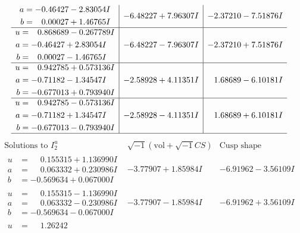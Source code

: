 \documentclass[1p]{elsarticle_modified}
\theoremstyle{definition}
\newcommand{\I}{\sqrt{-1}}
\begin{document}
$$\begin{array}{c|c|c}
\begin{aligned}
a &= -0.46427 - 2.83054 I \\
b &= \phantom{-}0.00027 + 1.46765 I\end{aligned}
 & -6.48227 + 7.96307 I & -2.37210 - 7.51876 I \\ \hline\begin{aligned}
u &= \phantom{-}0.868689 - 0.267789 I \\
a &= -0.46427 + 2.83054 I \\
b &= \phantom{-}0.00027 - 1.46765 I\end{aligned}
 & -6.48227 - 7.96307 I & -2.37210 + 7.51876 I \\ \hline\begin{aligned}
u &= \phantom{-}0.942785 + 0.573136 I \\
a &= -0.71182 - 1.34547 I \\
b &= -0.677013 + 0.793940 I\end{aligned}
 & -2.58928 + 4.11351 I & \phantom{-}1.68689 - 6.10181 I \\ \hline\begin{aligned}
u &= \phantom{-}0.942785 - 0.573136 I \\
a &= -0.71182 + 1.34547 I \\
b &= -0.677013 - 0.793940 I\end{aligned}
 & -2.58928 - 4.11351 I & \phantom{-}1.68689 + 6.10181 I\\
 \hline 
 \end{array}$$\newpage$$\begin{array}{c|c|c}  
\text{Solutions to }I^u_{2}& \I (\text{vol} + \sqrt{-1}CS) & \text{Cusp shape}\\
 \hline 
\begin{aligned}
u &= \phantom{-}0.155315 + 1.136990 I \\
a &= \phantom{-}0.063332 + 0.230986 I \\
b &= -0.569634 + 0.067000 I\end{aligned}
 & -3.77907 + 1.85984 I & -6.91962 - 3.56109 I \\ \hline\begin{aligned}
u &= \phantom{-}0.155315 - 1.136990 I \\
a &= \phantom{-}0.063332 - 0.230986 I \\
b &= -0.569634 - 0.067000 I\end{aligned}
 & -3.77907 - 1.85984 I & -6.91962 + 3.56109 I \\ \hline\begin{aligned}
u &= \phantom{-}1.26242\phantom{ +0.000000I} \\

\end{aligned}
\end{array}$$
\end{document}
